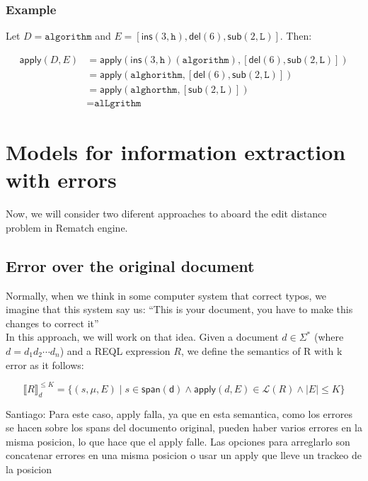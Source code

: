 \documentclass{article}
\begin{document}
\subsubsection{Example}

\begin{center}
    
Let $D = \texttt{algorithm}$ and $E = [\mathsf{ins}(3,\texttt{h}), \mathsf{del}(6), \mathsf{sub}(2,\texttt{L})]$. Then:

\begin{align*}
\mathsf{apply}(D, E) &= \mathsf{apply}(\mathsf{ins}(3,\texttt{h})(\texttt{algorithm}), [\mathsf{del}(6), \mathsf{sub}(2,\texttt{L})]) \\
&= \mathsf{apply}(\texttt{alghorithm}, [\mathsf{del}(6), \mathsf{sub}(2,\texttt{L})]) \\
&= \mathsf{apply}(\texttt{alghorthm}, [\mathsf{sub}(2,\texttt{L})]) \\
&= \texttt{alLgrithm}
\end{align*}
\end{center}

\section{Models for information extraction with errors}

Now, we will consider two diferent approaches to aboard the edit distance problem in Rematch engine. 

\subsection{Error over the original document}

Normally, when we think in some computer system that correct typos, we imagine that this system say us: ``This is your document, you have to make this changes to correct it''\\

In this approach, we will work on that idea. Given a document $d \in \Sigma^*$ (where $d = d_1d_2\cdots d_n$) and a REQL expression $R$, we define the semantics of R with k error as it follows:

\[ \llbracket R \rrbracket^{\leq K}_d = \{(s, \mu, E) \; | \; s \in\mathsf{span(d)} \land \mathsf{apply}(d, E) \in \mathcal{L}(R) \land |E| \leq K \}\]


\begin{notabox}
Santiago: Para este caso, apply falla, ya que en esta semantica, como los errores se hacen sobre los spans del documento original, pueden haber varios errores en la misma posicion, lo que hace que el apply falle. Las opciones para arreglarlo son concatenar errores en una misma posicion o usar un apply que lleve un trackeo de la posicion
\end{notabox}
\end{document}
